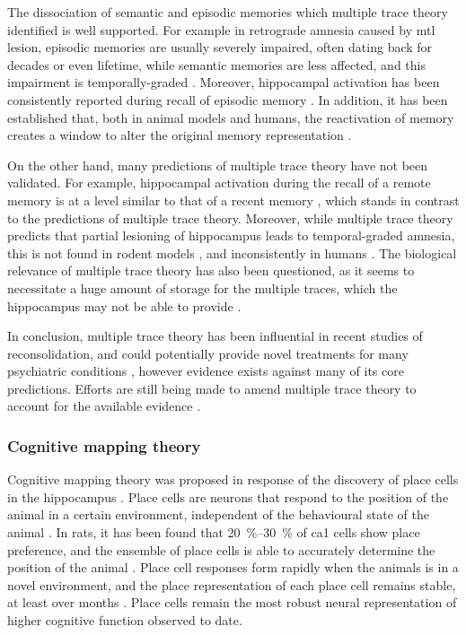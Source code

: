 The dissociation of semantic and episodic memories which multiple trace theory identified is well supported. For example in retrograde amnesia caused by \gls{mtl} lesion, episodic memories are usually severely impaired, often dating back for decades or even lifetime, while semantic memories are less affected, and this impairment is temporally-graded \citep{kapur97, vargha-khadem97, moscovitch05}. Moreover, hippocampal activation has been consistently reported during recall of episodic memory \citep{maguire01, svoboda06}. In addition, it has been established that, both in animal models and humans, the reactivation of memory creates a window to alter the original memory representation \citep{wang10, dunbar16}.

On the other hand, many predictions of multiple trace theory have not been validated. For example, hippocampal activation during the recall of a remote memory is at a level similar to that of a recent memory \citep{addis04, steinvorth06, wheeler13}, which stands in contrast to the predictions of multiple trace theory. Moreover, while multiple trace theory predicts that partial lesioning of hippocampus leads to temporal-graded amnesia, this is not found in rodent models \citep{sutherland10}, and inconsistently in humans \citep{yassa13}. The biological relevance of multiple trace theory has also been questioned, as it seems to necessitate a huge amount of storage for the multiple traces, which the hippocampus may not be able to provide \citep{yassa13}. 

In conclusion, multiple trace theory has been influential in recent studies of reconsolidation, and could potentially provide novel treatments for many psychiatric conditions \citep{dunbar16}, however evidence exists against many of its core predictions. Efforts are still being made to amend multiple trace theory to account for the available evidence \citep{moscovitch05, yassa13}.

\subsubsection{Cognitive mapping theory \label{hpc-spatial}}
Cognitive mapping theory was proposed in response of the discovery of place cells in the hippocampus \citep{o'keefe71, o'keefe78}. Place cells are neurons that respond to the position of the animal in a certain environment, independent of the behavioural state of the animal \citep{o'keefe78}. In rats, it has been found that \SIrange{20}{30}{\percent} of \gls{ca1} cells show place preference, and the ensemble of place cells is able to accurately determine the position of the animal \citep{guzowski99, o'keefe05, ziv13}. Place cell responses form rapidly when the animals is in a novel environment, and the place representation of each place cell remains stable, at least over months \citep{wilson93, ziv13}. Place cells remain the most robust neural representation of higher cognitive function observed to date.

